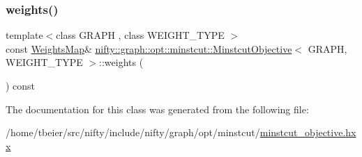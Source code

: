 \mbox{\label{classnifty_1_1graph_1_1opt_1_1minstcut_1_1MinstcutObjective_a7b9ef2574b0ff94756e361f6b5ac8c49}} 
\subsubsection{\texorpdfstring{weights()}{weights()}\hspace{0.1cm}{\footnotesize\ttfamily [2/2]}}
{\footnotesize\ttfamily template$<$class G\+R\+A\+PH , class W\+E\+I\+G\+H\+T\+\_\+\+T\+Y\+PE $>$ \\
const \hyperlink{classnifty_1_1graph_1_1opt_1_1minstcut_1_1MinstcutObjective_afba077d00b3dff86d2b482c1fb88344b}{Weights\+Map}\& \hyperlink{classnifty_1_1graph_1_1opt_1_1minstcut_1_1MinstcutObjective}{nifty\+::graph\+::opt\+::minstcut\+::\+Minstcut\+Objective}$<$ G\+R\+A\+PH, W\+E\+I\+G\+H\+T\+\_\+\+T\+Y\+PE $>$\+::weights (\begin{DoxyParamCaption}{ }\end{DoxyParamCaption}) const\hspace{0.3cm}{\ttfamily [inline]}}



The documentation for this class was generated from the following file\+:\begin{DoxyCompactItemize}
\item 
/home/tbeier/src/nifty/include/nifty/graph/opt/minstcut/\hyperlink{graph_2opt_2minstcut_2minstcut__objective_8hxx}{minstcut\+\_\+objective.\+hxx}\end{DoxyCompactItemize}
